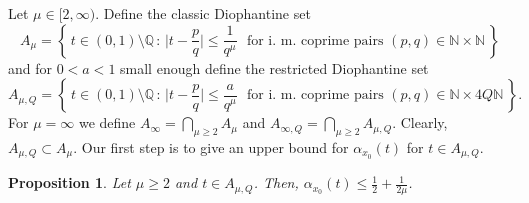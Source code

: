 \documentclass[11pt,reqno]{amsart}
\newtheorem{prop}[thm]{Proposition}
\theoremstyle{definition}
\begin{document}
Let $\mu \in [2, \infty)$. 
Define the classic Diophantine set
\begin{equation}
A_\mu = \left\{ \, t \in (0,1) \setminus \mathbb Q \, : \,   \big| t - \frac{p}{q} \big| \leq \frac{1}{q^\mu} \, \, \text{ for i. m. coprime pairs } (p,q) \in \mathbb N \times \mathbb N    \,    \right\}
\end{equation}
and for $0 < a < 1$ small enough define the restricted Diophantine set
\begin{equation}
 A_{\mu,Q} = \left\{ \, t \in (0,1) \setminus \mathbb Q \, : \,   \big| t - \frac{p}{q} \big| \leq \frac{a}{q^\mu} \, \, \text{ for i. m. coprime pairs } (p,q) \in \mathbb N \times 4Q\mathbb N   \,    \right\}.
\end{equation}
For $\mu = \infty$ we define 
$A_\infty = \bigcap_{\mu \geq 2} A_\mu$ and 
$A_{\infty, Q} = \bigcap_{\mu \geq 2} A_{\mu, Q}$. 
Clearly, $  A_{\mu,Q} \subset A_\mu$. 
Our first step is to give an upper bound for $\alpha_{x_0}(t)$ for $t \in  A_{\mu,Q}$. 
\begin{prop}\label{thm:Upper_Bound_For_Holder_regularity}
Let $\mu \geq 2$ and $t \in A_{\mu,Q}$. 
Then, 
$\alpha_{x_0}(t) \leq \frac12 + \frac{1}{2\mu}$. 
\end{prop}
\end{document}
